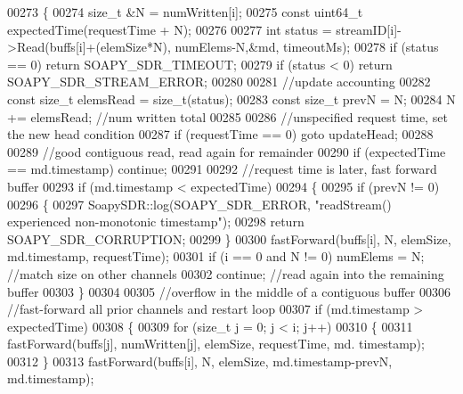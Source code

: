 \begin{DoxyCode}
00273     \{
00274         \textcolor{keywordtype}{size\_t} &N = numWritten[i];
00275         \textcolor{keyword}{const} uint64\_t expectedTime(requestTime + N);
00276 
00277         \textcolor{keywordtype}{int} status = streamID[i]->Read(buffs[i]+(elemSize*N), numElems-N,&md, timeoutMs);
00278         \textcolor{keywordflow}{if} (status == 0) \textcolor{keywordflow}{return} SOAPY_SDR_TIMEOUT;
00279         \textcolor{keywordflow}{if} (status < 0) \textcolor{keywordflow}{return} SOAPY_SDR_STREAM_ERROR;
00280 
00281         \textcolor{comment}{//update accounting}
00282         \textcolor{keyword}{const} \textcolor{keywordtype}{size\_t} elemsRead = size\_t(status);
00283         \textcolor{keyword}{const} \textcolor{keywordtype}{size\_t} prevN = N;
00284         N += elemsRead; \textcolor{comment}{//num written total}
00285 
00286         \textcolor{comment}{//unspecified request time, set the new head condition}
00287         \textcolor{keywordflow}{if} (requestTime == 0) \textcolor{keywordflow}{goto} updateHead;
00288 
00289         \textcolor{comment}{//good contiguous read, read again for remainder}
00290         \textcolor{keywordflow}{if} (expectedTime == md.timestamp) \textcolor{keywordflow}{continue};
00291 
00292         \textcolor{comment}{//request time is later, fast forward buffer}
00293         \textcolor{keywordflow}{if} (md.timestamp < expectedTime)
00294         \{
00295             \textcolor{keywordflow}{if} (prevN != 0)
00296             \{
00297                 SoapySDR::log(SOAPY_SDR_ERROR, \textcolor{stringliteral}{"readStream() experienced non-monotonic timestamp"});
00298                 \textcolor{keywordflow}{return} SOAPY_SDR_CORRUPTION;
00299             \}
00300             fastForward(buffs[i], N, elemSize, md.timestamp, requestTime);
00301             \textcolor{keywordflow}{if} (i == 0 and N != 0) numElems = N; \textcolor{comment}{//match size on other channels}
00302             \textcolor{keywordflow}{continue}; \textcolor{comment}{//read again into the remaining buffer}
00303         \}
00304 
00305         \textcolor{comment}{//overflow in the middle of a contiguous buffer}
00306         \textcolor{comment}{//fast-forward all prior channels and restart loop}
00307         \textcolor{keywordflow}{if} (md.timestamp > expectedTime)
00308         \{
00309             \textcolor{keywordflow}{for} (\textcolor{keywordtype}{size\_t} j = 0; j < i; j++)
00310             \{
00311                 fastForward(buffs[j], numWritten[j], elemSize, requestTime, md.
      timestamp);
00312             \}
00313             fastForward(buffs[i], N, elemSize, md.timestamp-prevN, md.timestamp);

\end{DoxyCode}
